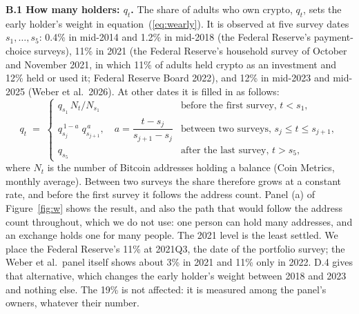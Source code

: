 \documentclass[11pt]{article}
\begin{document}
\textbf{B.1 How many holders: $q_t$.} The share of adults who own crypto, $q_t$, sets the early holder's weight in equation~(\ref{eq:wearly}). It is observed at five survey dates $s_1, \dots, s_5$: 0.4\% in mid-2014 and 1.2\% in mid-2018 (the Federal Reserve's payment-choice surveys), 11\% in 2021 (the Federal Reserve's household survey of October and November 2021, in which 11\% of adults held crypto as an investment and 12\% held or used it; Federal Reserve Board 2022), and 12\% in mid-2023 and mid-2025 (Weber et al.\ 2026). At other dates it is filled in as follows:
\begin{equation}
q_t \;=\;
\begin{cases}
q_{s_1}\, N_t / N_{s_1} & \text{before the first survey, } t < s_1,\\[3pt]
q_{s_j}^{\,1-a}\; q_{s_{j+1}}^{\,a}, \quad a = \dfrac{t - s_j}{s_{j+1} - s_j} & \text{between two surveys, } s_j \le t \le s_{j+1},\\[6pt]
q_{s_5} & \text{after the last survey, } t > s_5,
\end{cases}
\label{eq:q}
\end{equation}
where $N_t$ is the number of Bitcoin addresses holding a balance (Coin Metrics, monthly average). Between two surveys the share therefore grows at a constant rate, and before the first survey it follows the address count. Panel (a) of Figure~\ref{fig:w} shows the result, and also the path that would follow the address count throughout, which we do not use: one person can hold many addresses, and an exchange holds one for many people. The 2021 level is the least settled. We place the Federal Reserve's 11\% at 2021Q3, the date of the portfolio survey; the Weber et al.\ panel itself shows about 3\% in 2021 and 11\% only in 2022. D.4 gives that alternative, which changes the early holder's weight between 2018 and 2023 and nothing else. The 19\% is not affected: it is measured among the panel's owners, whatever their number.
\end{document}
